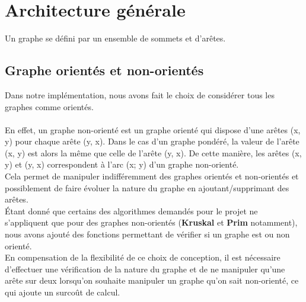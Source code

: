 \documentclass[12pt]{article}
\begin{document}
\newpage		
\tableofcontents
{}

\clearpage 


\section{Architecture générale}
Un graphe se défini par un ensemble de sommets et d'arêtes. 
\subsection{Graphe orientés et non-orientés}
Dans notre implémentation, nous avons fait le choix de considérer tous les graphes comme orientés. \\
\\
En effet, un graphe non-orienté est un graphe orienté qui dispose d'une arêtes (x, y) pour chaque arête (y, x). Dans le cas d'un graphe pondéré, la valeur de l'arête (x, y) est alors la même que celle de l'arête (y, x). De cette manière, les arêtes (x, y) et (y, x) correspondent à l'arc (x; y) d'un graphe non-orienté.\\ 

Cela permet de manipuler indifféremment des graphes orientés et non-orientés et possiblement de faire évoluer la nature du graphe en ajoutant/supprimant des arêtes. \\ 

Étant donné que certains des algorithmes demandés pour le projet ne s'appliquent que pour des graphes non-orientés ({\bf Kruskal} et {\bf Prim} notamment), nous avons ajouté des fonctions permettant de vérifier si un graphe est ou non orienté.\\ 

En compensation de la flexibilité de ce choix de conception, il est nécessaire d'effectuer une vérification de la nature du graphe et de ne manipuler qu'une arête sur deux lorsqu'on souhaite manipuler un graphe qu'on sait non-orienté, ce qui ajoute un surcoût de calcul. \\ 

\clearpage
\end{document}
